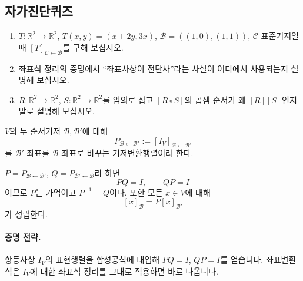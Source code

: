 \subsection*{자가진단퀴즈}
\begin{enumerate}[label=\arabic*.]
\item $T:\mathbb R^2\to\mathbb R^2$, $T(x,y)=(x+2y,3x)$, $\mathcal B=((1,0),(1,1))$, $\mathcal C$ 표준기저일 때 $[T]_{\mathcal C\leftarrow\mathcal B}$를 구해 보십시오.
\item 좌표식 정리의 증명에서 ``좌표사상이 전단사''라는 사실이 어디에서 사용되는지 설명해 보십시오.
\item $R:\mathbb R^2\to\mathbb R^2$, $S:\mathbb R^2\to\mathbb R^2$를 임의로 잡고 $[R\circ S]$의 곱셈 순서가 왜 $[R][S]$인지 말로 설명해 보십시오.
\end{enumerate}


\begin{definition}
$V$의 두 순서기저 $\mathcal B,\mathcal B'$에 대해
$$
P_{\mathcal B\leftarrow\mathcal B'}
:=
[I_V]_{\mathcal B\leftarrow\mathcal B'}
$$
를 $\mathcal B'$-좌표를 $\mathcal B$-좌표로 바꾸는 기저변환행렬이라 한다.
\end{definition}

\begin{theorem}[기저변환행렬의 기본 성질]
$P=P_{\mathcal B\leftarrow\mathcal B'}$, $Q=P_{\mathcal B'\leftarrow\mathcal B}$라 하면
$$
PQ=I,\qquad QP=I
$$
이므로 $P$는 가역이고 $P^{-1}=Q$이다. 또한 모든 $x\in V$에 대해
$$
[x]_{\mathcal B}=P[x]_{\mathcal B'}
$$
가 성립한다.
\end{theorem}

\paragraph{증명 전략.}
항등사상 $I_V$의 표현행렬을 합성공식에 대입해 $PQ=I$, $QP=I$를 얻습니다. 좌표변환식은 $I_V$에 대한 좌표식 정리를 그대로 적용하면 바로 나옵니다.

